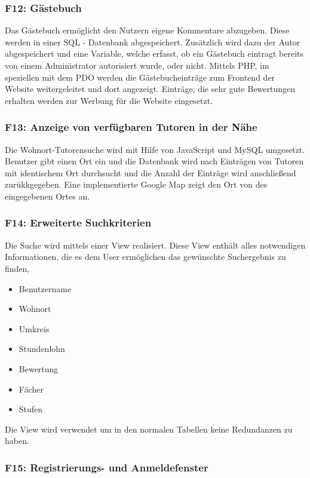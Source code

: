 \documentclass[10pt,a4paper]{scrartcl}
\begin{document}
\subsubsection*{F12: Gästebuch}

Das Gästebuch ermöglicht den Nutzern eigene Kommentare abzugeben. Diese werden in einer SQL - Datenbank abgespeichert. Zusätzlich wird dazu der Autor abgespeichert und eine Variable, welche erfasst, ob ein Gästebuch eintragt bereits von einem Administrator autorisiert wurde, oder nicht. Mittels PHP, im speziellen mit dem PDO werden die Gästebucheinträge zum Frontend der Website weitergeleitet und dort angezeigt. Einträge, die sehr gute Bewertungen erhalten werden zur Werbung für die Website eingesetzt.

\subsubsection*{F13: Anzeige von verfügbaren Tutoren in der Nähe}

Die Wohnort-Tutorensuche wird mit Hilfe von JavaScript und MySQL umgesetzt. Benutzer gibt einen Ort ein und die Datenbank wird nach Eintr\"agen von Tutoren mit identischem Ort durchsucht und die Anzahl der Eintr\"age wird anschlie{\ss}end zur\"ukkgegeben. Eine implementierte Google Map zeigt den Ort von des eingegebenen Ortes an.

\subsubsection*{F14: Erweiterte Suchkriterien}

Die Suche wird mittels einer View realisiert. Diese View enthält alles notwendigen Informationen, die es dem User ermöglichen das gewünschte Suchergebnis zu finden,
\begin{itemize}
 \item Benutzername
 \item Wohnort
 \item Umkreis
 \item Stundenlohn
 \item Bewertung
 \item Fächer
 \item Stufen
\end{itemize}

Die View wird verwendet um in den normalen Tabellen keine Redundanzen zu haben. 

\subsubsection*{F15: Registrierungs- und Anmeldefenster}
\end{document}
